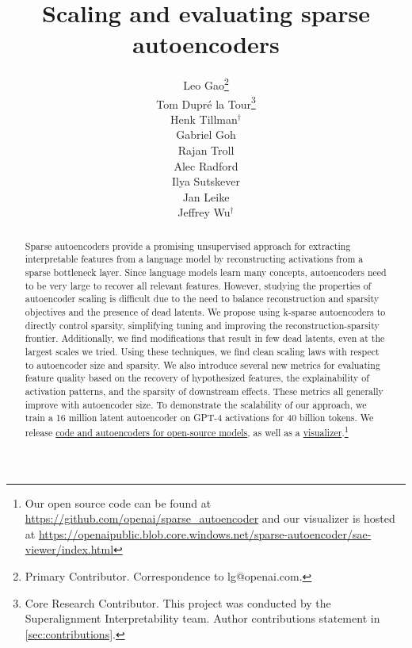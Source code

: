 \documentclass{article}
\title{Scaling and evaluating sparse autoencoders}
\author{%
  Leo Gao\thanks{Primary Contributor. Correspondence to lg@openai.com. } \\
  \And
  Tom Dupr\'e la Tour\thanks{Core Research Contributor. This project was conducted by the Superalignment Interpretability team. Author contributions statement in  \autoref{sec:contributions}.} \\
  \And
  Henk Tillman$^\dagger$ \\
  \AND
  Gabriel Goh \\
  \And
  Rajan Troll \\
  \And
  Alec Radford \\
  \AND
  Ilya Sutskever \\
  \And
  Jan Leike \\
  \And
  Jeffrey Wu$^\dagger$ \\
  \AND
  \normalfont{OpenAI}
}
\begin{document}
\maketitle
\vspace{-2mm}
\begin{abstract}



Sparse autoencoders provide a promising unsupervised approach for extracting interpretable features from a language model by reconstructing activations from a sparse bottleneck layer.  Since language models learn many concepts, autoencoders need to be very large to recover all relevant features.  However, studying the properties of autoencoder scaling is difficult due to the need to balance reconstruction and sparsity objectives and the presence of dead latents.  We propose using k-sparse autoencoders \citep{makhzani2013k} to directly control sparsity, simplifying tuning and improving the reconstruction-sparsity frontier. Additionally, we find modifications that result in few dead latents, even at the largest scales we tried.  Using these techniques, we find clean scaling laws with respect to autoencoder size and sparsity.  We also introduce several new metrics for evaluating feature quality based on the recovery of hypothesized features, the explainability of activation patterns, and the sparsity of downstream effects. These metrics all generally improve with autoencoder size.  To demonstrate the scalability of our approach, we train a 16 million latent autoencoder on GPT-4 activations for 40 billion tokens.  We release \href{https://github.com/openai/sparse_autoencoder}{code and autoencoders for open-source models}, as well as a \href{https://openaipublic.blob.core.windows.net/sparse-autoencoder/sae-viewer/index.html}{visualizer}.\footnote{Our open source code can be found at \href{https://github.com/openai/sparse_autoencoder}{https://github.com/openai/sparse\_autoencoder} and our visualizer is hosted at \href{https://openaipublic.blob.core.windows.net/sparse-autoencoder/sae-viewer/index.html}{https://openaipublic.blob.core.windows.net/sparse-autoencoder/sae-viewer/index.html}}




\end{abstract}










\end{document}
